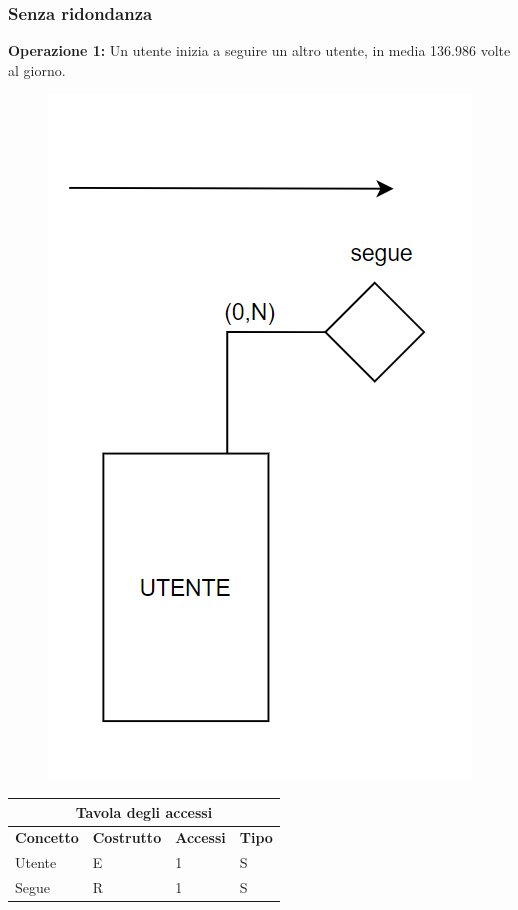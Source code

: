 \subsubsection*{Senza ridondanza} 
\textbf{Operazione 1:} Un utente inizia a seguire un altro utente, in media 136.986 volte al giorno.
\begin{figure}[h]
    \centering
    \includegraphics[scale = 0.5]{img/ridondanza11.png}
\end{figure}
\begin{center}
\begin{tabular}{|p{3cm}|p{3cm}|p{3cm}|p{3cm}|}
\hline
\multicolumn{4}{|c|}{\textbf{Tavola degli accessi}}\\
\hline
 \multicolumn{1}{|c|}{\textbf{Concetto}} 
 & \multicolumn{1}{|c|}{\textbf{Costrutto}}
 & \multicolumn{1}{|c|}{\textbf{Accessi}}
 & \multicolumn{1}{|c|}{\textbf{Tipo}}\\
  \hline
  Utente & E & 1 & S\\
  \hline
  Segue & R & 1 & S\\
 \hline
\end{tabular}
\end{center}
